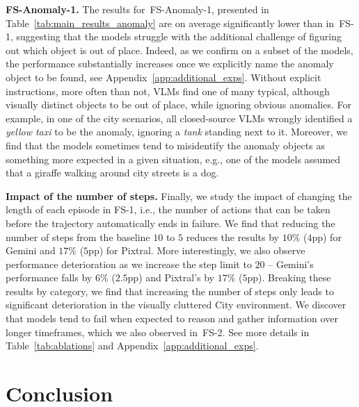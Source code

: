 \documentclass{article}
\theoremstyle{plain}
\theoremstyle{definition}
\theoremstyle{remark}
\newcommand{\challenge}{FS-1}
\newcommand{\anomalychallenge}{FS-Anomaly-1}
\newcommand{\hardchallenge}{FS-2}
\begin{document}
\textbf{\anomalychallenge{}.} The results for~\anomalychallenge{}, presented in Table~\ref{tab:main_results_anomaly} are on average significantly lower than in~\challenge{}, suggesting that the models struggle with the additional challenge of figuring out which object is out of place. Indeed, as we confirm on a subset of the models, the performance substantially increases once we explicitly name the anomaly object to be found,  see Appendix~\ref{app:additional_exps}. Without explicit instructions, more often than not, VLMs find one of many typical, although visually distinct objects to be out of place, while ignoring obvious anomalies. For example, in one of the city scenarios, all closed-source VLMs wrongly identified a \textit{yellow taxi} to be the anomaly, ignoring a \textit{tank} standing next to it. Moreover, we find that the models sometimes tend to misidentify the anomaly objects as something more expected in a given situation, e.g., one of the models assumed that a giraffe walking around city streets is a dog. 



\textbf{Impact of the number of steps.}
Finally, we study the impact of changing the length of each episode in \challenge{}, i.e., the number of actions that can be taken before the trajectory automatically ends in failure. We find that reducing the number of steps from the baseline $10$ to $5$ reduces the results by $10\%$ ($4$pp) for Gemini and $17\%$ ($5$pp) for Pixtral. More interestingly, we also observe performance deterioration as we increase the step limit to $20$ -- Gemini's performance falls by $6\%$ ($2.5$pp) and Pixtral's by $17\%$ ($5$pp). Breaking these results by category, we find that increasing the number of steps only leads to significant deterioration in the visually cluttered City environment. We discover that models tend to fail when expected to reason 
and gather information over longer timeframes, which we also observed in~\hardchallenge{}.
See more details in Table~\ref{tab:ablations} and Appendix~\ref{app:additional_exps}.


\section{Conclusion}
\label{sec:conclusion}
\end{document}
